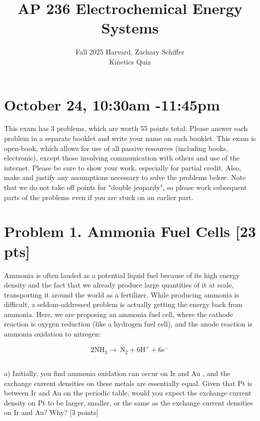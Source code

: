 \documentclass[12pt]{article}
\title{AP 236 Electrochemical Energy Systems }
\author{Fall 2025 Harvard, Zachary Schiffer\\
Kinetics Quiz}
\date{}
\begin{document}
\maketitle


\section*{October 24, 10:30am -11:45pm}
This exam has 3 problems, which are worth 55 points total. Please answer each problem in a separate booklet and write your name on each booklet. This exam is open-book, which allows for use of all passive resources (including books, electronic), except those involving communication with others and use of the internet. Please be sure to show your work, especially for partial credit. Also, make and justify any assumptions necessary to solve the problems below. Note that we do not take off points for "double jeopardy", so please work subsequent parts of the problems even if you are stuck on an earlier part.

\section{Problem 1. Ammonia Fuel Cells [23 pts]}
Ammonia is often lauded as a potential liquid fuel because of its high energy density and the fact that we already produce large quantities of it at scale, transporting it around the world as a fertilizer. While producing ammonia is difficult, a seldom-addressed problem is actually getting the energy back from ammonia. Here, we are proposing an ammonia fuel cell, where the cathode reaction is oxygen reduction (like a hydrogen fuel cell), and the anode reaction is ammonia oxidation to nitrogen:

$$
2 \mathrm{NH}_{3} \rightarrow \mathrm{~N}_{2}+6 \mathrm{H}^{+}+6 e^{-}
$$
\subsection{}
a) Initially, you find ammonia oxidation can occur on Ir and Au , and the exchange current densities on these metals are essentially equal. Given that Pt is between Ir and Au on the periodic table, would you expect the exchange current density on Pt to be larger, smaller, or the same as the exchange current densities on Ir and Au? Why? [3 points]
\end{document}
